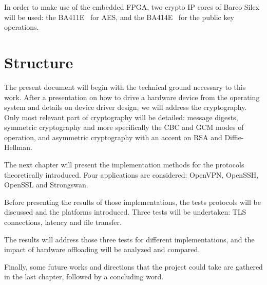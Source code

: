 In order to make use of the embedded FPGA, two crypto IP cores of Barco Silex will be used: the BA411E~\cite{barco-ba411e} for AES, and the BA414E~\cite{barco-ba414e} for the public key operations.




\section{Structure}
The present document will begin with the technical ground necessary to this work.
After a presentation on how to drive a hardware device from the operating system and details on device driver design, we will address the cryptography.
Only most relevant part of cryptography will be detailed: message digests, symmetric cryptography and more specifically the CBC and GCM modes of operation, and asymmetric cryptography with an accent on RSA and Diffie-Hellman.

The next chapter will present the implementation methods for the protocols theoretically introduced.
Four applications are considered: OpenVPN, OpenSSH, OpenSSL and Strongswan.

Before presenting the results of those implementations, the tests protocols will be discussed and the platforms introduced.
Three tests will be undertaken: TLS connections, latency and file transfer.

The results will address those three tests for different implementations, and the impact of hardware offloading will be analyzed and compared.

Finally, some future works and directions that the project could take are gathered in the last chapter, followed by a concluding word.